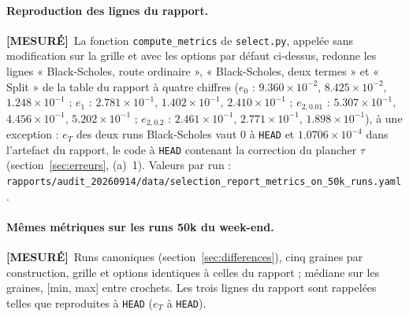 \documentclass[11pt]{article}
\newcommand{\mesure}{\textbf{[MESURÉ]}}
\newcommand{\code}[1]{\texttt{#1}}
\begin{document}
\paragraph{Reproduction des lignes du rapport.} \mesure\ La fonction
\code{compute\_metrics} de \code{select.py}, appelée sans modification sur la
grille et avec les options par défaut ci-dessus, redonne les lignes
« Black-Scholes, route ordinaire », « Black-Scholes, deux termes » et
« Split » de la table du rapport à quatre chiffres
($e_0$ : $9.360\times10^{-2}$, $8.425\times10^{-2}$, $1.248\times10^{-1}$ ;
$e_1$ : $2.781\times10^{-1}$, $1.402\times10^{-1}$, $2.410\times10^{-1}$ ;
$e_{2,0.01}$ : $5.307\times10^{-1}$, $4.456\times10^{-1}$, $5.202\times10^{-1}$ ;
$e_{2,0.2}$ : $2.461\times10^{-1}$, $2.771\times10^{-1}$, $1.898\times10^{-1}$),
à une exception : $e_T$ des deux runs Black-Scholes vaut $0$ à \code{HEAD}
et $1.0706\times10^{-4}$ dans l'artefact du rapport, le code à \code{HEAD}
contenant la correction du plancher $\tau$ (section~\ref{sec:erreurs}, (a)~1).
Valeurs par run : \code{rapports/audit\_20260914/data/selection\_report\_metrics\_on\_50k\_runs.yaml}.

\paragraph{Mêmes métriques sur les runs 50k du week-end.} \mesure\ Runs
canoniques (section~\ref{sec:differences}), cinq graines par construction,
grille et options identiques à celles du rapport ; médiane sur les graines,
[min, max] entre crochets. Les trois lignes du rapport sont rappelées telles
que reproduites à \code{HEAD} ($e_T$ à \code{HEAD}).
\end{document}
